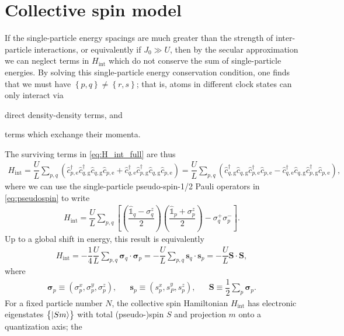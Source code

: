 \documentclass[aps,notitlepage,nofootinbib,11pt]{revtex4-1}
\renewcommand{\t}{\text} %
\newcommand{\f}[2]{\dfrac{#1}{#2}} %
\newcommand{\p}[1]{\left(#1\right)} %
\renewcommand{\sp}[1]{\left[#1\right]} %
\renewcommand{\set}[1]{\left\{#1\right\}} %
\renewcommand{\v}{\bm} %
\renewcommand{\c}{\cdot} %
\newcommand{\g}{\text{g}} %
\newcommand{\e}{\text{e}}
\newcommand{\1}{\hat{\mathds{1}}}
\begin{document}
\section{Collective spin model}

If the single-particle energy spacings are much greater than the
strength of inter-particle interactions, or equivalently if
$J_0\gg U$, then by the secular approximation we can neglect terms in
$H_{\t{int}}$ which do not conserve the sum of single-particle
energies.  By solving this single-particle energy conservation
condition, one finds that we must have $\set{p,q}\ne\set{r,s}$; that
is, atoms in different clock states can only interact via
\begin{enumerate*}[label=(\roman*)]
\item direct density-density terms, and
\item terms which exchange their momenta.
\end{enumerate*}
The surviving terms in \eqref{eq:H_int_full} are thus
\begin{align}
  H_{\t{int}}
  = \f{U}{L} \sum_{p,q}
  \p{\hat c_{p,\e}^\dag \hat c_{q,\g}^\dag \hat c_{q,\g} \hat c_{p,\e}
    + \hat c_{q,\e}^\dag \hat c_{p,\g}^\dag \hat c_{q,\g} \hat c_{p,\e}}
  = \f{U}{L} \sum_{p,q}
  \p{\hat c_{q,\g}^\dag \hat c_{q,\g} \hat c_{p,\e}^\dag \hat c_{p,\e}
    - \hat c_{q,\e}^\dag \hat c_{q,\g} \hat c_{p,\g}^\dag \hat c_{p,\e}},
\end{align}
where we can use the single-particle pseudo-spin-1/2 Pauli operators
in \eqref{eq:pseudospin} to write
\begin{align}
  H_{\t{int}} = \f{U}{L} \sum_{p,q}
  \sp{\p{\f{\1_q-\sigma_q^z}{2}} \p{\f{\1_p+\sigma_p^z}{2}}
    - \sigma_q^+ \sigma_p^-}.
\end{align}
Up to a global shift in energy, this result is equivalently
\begin{align}
  H_{\t{int}}
  = - \f14 \f{U}{L} \sum_{p,q} \v{\sigma}_q\c\v{\sigma}_p
  = - \f{U}{L} \sum_{p,q} \v s_q \c\v s_p
  = - \f{U}{L} \v S \c \v S,
\end{align}
where
\begin{align}
  \v{\sigma}_p
  \equiv \p{\sigma_p^x,\sigma_p^y,\sigma_p^z},
  &&
  \v s_p \equiv \p{s_p^x,s_P^y,s_p^z},
  &&
  \v S \equiv \f12 \sum_p \v{\sigma}_p.
  \label{eq:H_int}
\end{align}
For a fixed particle number $N$, the collective spin Hamiltonian
$H_{\t{int}}$ has electronic eigenstates $\set{\ket{Sm}}$ with total
(pseudo-)spin $S$ and projection $m$ onto a quantization axis; the
\end{document}
